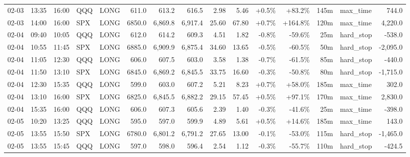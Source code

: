 \documentclass[11pt,a4paper,twoside]{article}
\begin{document}
\begin{landscape}
\begin{center}
\begin{longtable}{>{\color{txtmain}}l l l l l r r r r r r r r >{\color{txtmain}}l r}
02-03 & 13:35 & 16:00 & QQQ & LONG & 611.0 & 613.2 & 616.5 & 2.98 & 5.46 & \textcolor{wingreen}{+0.5\%} & \textcolor{wingreen}{+83.2\%} & 145m & max\_time & \textcolor{wingreen}{744.0} \\
02-03 & 14:00 & 16:00 & SPX & LONG & 6850.0 & 6,869.8 & 6,917.4 & 25.60 & 67.80 & \textcolor{wingreen}{+0.7\%} & \textcolor{wingreen}{+164.8\%} & 120m & max\_time & \textcolor{wingreen}{4,220.0} \\
02-04 & 09:40 & 10:05 & QQQ & LONG & 612.0 & 614.2 & 609.3 & 4.51 & 1.82 & \textcolor{lossred}{-0.8\%} & \textcolor{lossred}{-59.6\%} & 25m & hard\_stop & \textcolor{lossred}{-538.0} \\
02-04 & 10:55 & 11:45 & SPX & LONG & 6885.0 & 6,909.9 & 6,875.4 & 34.60 & 13.65 & \textcolor{lossred}{-0.5\%} & \textcolor{lossred}{-60.5\%} & 50m & hard\_stop & \textcolor{lossred}{-2,095.0} \\
02-04 & 11:05 & 12:30 & QQQ & LONG & 606.0 & 607.5 & 603.0 & 3.58 & 1.38 & \textcolor{lossred}{-0.7\%} & \textcolor{lossred}{-61.5\%} & 85m & hard\_stop & \textcolor{lossred}{-440.0} \\
02-04 & 11:50 & 13:10 & SPX & LONG & 6845.0 & 6,869.2 & 6,845.5 & 33.75 & 16.60 & \textcolor{lossred}{-0.3\%} & \textcolor{lossred}{-50.8\%} & 80m & hard\_stop & \textcolor{lossred}{-1,715.0} \\
02-04 & 12:30 & 15:35 & QQQ & LONG & 599.0 & 603.0 & 607.2 & 5.21 & 8.23 & \textcolor{wingreen}{+0.7\%} & \textcolor{wingreen}{+58.0\%} & 185m & max\_time & \textcolor{wingreen}{302.0} \\
02-04 & 13:10 & 16:00 & SPX & LONG & 6825.0 & 6,845.5 & 6,882.2 & 29.15 & 57.45 & \textcolor{wingreen}{+0.5\%} & \textcolor{wingreen}{+97.1\%} & 170m & max\_time & \textcolor{wingreen}{2,830.0} \\
02-04 & 15:35 & 16:00 & QQQ & LONG & 606.0 & 607.3 & 605.6 & 2.39 & 1.40 & \textcolor{lossred}{-0.3\%} & \textcolor{lossred}{-41.6\%} & 25m & max\_time & \textcolor{lossred}{-398.0} \\
02-05 & 10:20 & 13:25 & QQQ & LONG & 595.0 & 597.0 & 599.9 & 4.89 & 5.61 & \textcolor{wingreen}{+0.5\%} & \textcolor{wingreen}{+14.6\%} & 185m & max\_time & \textcolor{wingreen}{143.0} \\
02-05 & 13:55 & 15:50 & SPX & LONG & 6780.0 & 6,801.2 & 6,791.2 & 27.65 & 13.00 & \textcolor{lossred}{-0.1\%} & \textcolor{lossred}{-53.0\%} & 115m & hard\_stop & \textcolor{lossred}{-1,465.0} \\
02-05 & 13:55 & 15:45 & QQQ & LONG & 597.0 & 598.0 & 596.4 & 2.54 & 1.12 & \textcolor{lossred}{-0.3\%} & \textcolor{lossred}{-55.7\%} & 110m & hard\_stop & \textcolor{lossred}{-424.5} \\

\end{longtable}
\end{center}
\end{landscape}
\end{document}
